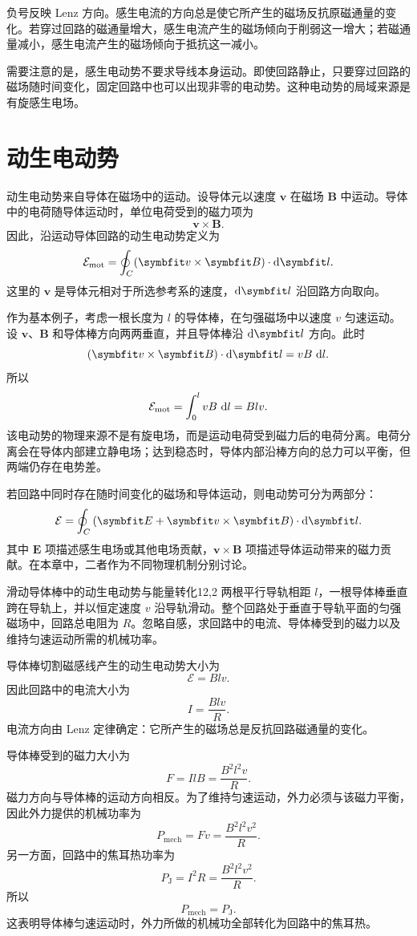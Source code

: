 负号反映 Lenz 方向。感生电流的方向总是使它所产生的磁场反抗原磁通量的变化。若穿过回路的磁通量增大，感生电流产生的磁场倾向于削弱这一增大；若磁通量减小，感生电流产生的磁场倾向于抵抗这一减小。

需要注意的是，感生电动势不要求导线本身运动。即使回路静止，只要穿过回路的磁场随时间变化，固定回路中也可以出现非零的电动势。这种电动势的局域来源是有旋感生电场。

\section{动生电动势}

动生电动势来自导体在磁场中的运动。设导体元以速度 $\bm{v}$ 在磁场 $\bm{B}$ 中运动。导体中的电荷随导体运动时，单位电荷受到的磁力项为
\[
\bm{v}\times\bm{B}.
\]
因此，沿运动导体回路的动生电动势定义为
\begin{equation}
	\mathcal{E}_{\mathrm{mot}}
	=
	\oint_{C}
	(\bm{v}\times\bm{B})\cdot\dif\bm{l}.
	\label{eq:12:motional-emf-definition}
\end{equation}
这里的 $\bm{v}$ 是导体元相对于所选参考系的速度，$\dif\bm{l}$ 沿回路方向取向。

作为基本例子，考虑一根长度为 $l$ 的导体棒，在匀强磁场中以速度 $v$ 匀速运动。设 $\bm{v}$、$\bm{B}$ 和导体棒方向两两垂直，并且导体棒沿 $\dif\bm{l}$ 方向。此时
\[
(\bm{v}\times\bm{B})\cdot\dif\bm{l}
=
vB\,\dif l.
\]
所以
\[
\mathcal{E}_{\mathrm{mot}}
=
\int_{0}^{l}vB\,\mathop{}\!\mathrm{d} l
=
Blv.
\]
该电动势的物理来源不是有旋电场，而是运动电荷受到磁力后的电荷分离。电荷分离会在导体内部建立静电场；达到稳态时，导体内部沿棒方向的总力可以平衡，但两端仍存在电势差。

若回路中同时存在随时间变化的磁场和导体运动，则电动势可分为两部分：
\begin{equation}
	\mathcal{E}
	=
	\oint_{C}
	\left(
	\bm{E}
	+
	\bm{v}\times\bm{B}
	\right)
	\cdot\dif\bm{l}.
	\label{eq:12:total-emf-local}
\end{equation}
其中 $\bm{E}$ 项描述感生电场或其他电场贡献，$\bm{v}\times\bm{B}$ 项描述导体运动带来的磁力贡献。在本章中，二者作为不同物理机制分别讨论。

\begin{example}{滑动导体棒中的动生电动势与能量转化}{12,2}
两根平行导轨相距 $l$，一根导体棒垂直跨在导轨上，并以恒定速度 $v$ 沿导轨滑动。整个回路处于垂直于导轨平面的匀强磁场中，回路总电阻为 $R$。忽略自感，求回路中的电流、导体棒受到的磁力以及维持匀速运动所需的机械功率。

\begin{solution}
导体棒切割磁感线产生的动生电动势大小为
\[
\mathcal{E}=Blv.
\]
因此回路中的电流大小为
\[
I=\frac{Blv}{R}.
\]
电流方向由 Lenz 定律确定：它所产生的磁场总是反抗回路磁通量的变化。

导体棒受到的磁力大小为
\[
F=IlB
=
\frac{B^{2}l^{2}v}{R}.
\]
磁力方向与导体棒的运动方向相反。为了维持匀速运动，外力必须与该磁力平衡，因此外力提供的机械功率为
\[
P_{\mathrm{mech}}
=
Fv
=
\frac{B^{2}l^{2}v^{2}}{R}.
\]
另一方面，回路中的焦耳热功率为
\[
P_{\mathrm{J}}
=
I^{2}R
=
\frac{B^{2}l^{2}v^{2}}{R}.
\]
所以
\[
P_{\mathrm{mech}}=P_{\mathrm{J}}.
\]
这表明导体棒匀速运动时，外力所做的机械功全部转化为回路中的焦耳热。
\end{solution}
\end{example}

